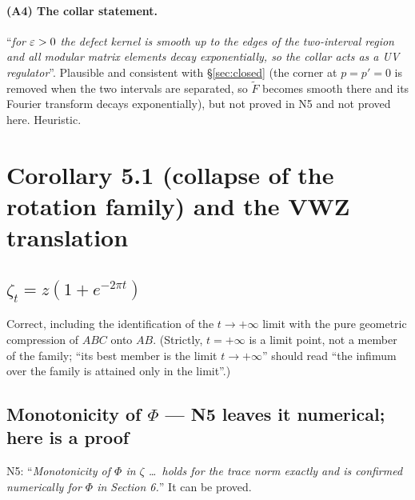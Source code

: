 \documentclass[11pt]{article}
\newcommand{\Nf}[1]{\textsf{[N4,\,#1]}}
\begin{document}
\paragraph{(A4) The collar statement.}
``\emph{for $\varepsilon>0$ the defect kernel is smooth up to the edges of the two-interval region and all
modular matrix elements decay exponentially, so the collar acts as a UV regulator}''.  Plausible
and consistent with \S\ref{sec:closed} (the corner at $p=p'=0$ is removed when the two intervals
are separated, so $\widetilde F$ becomes smooth there and its Fourier transform decays
exponentially), but not proved in N5 and not proved here.  Heuristic.

\section{Corollary 5.1 (collapse of the rotation family) and the VWZ translation}\label{sec:cor51}

\subsection{$\zeta_t=z(1+e^{-2\pi t})$}
\lby{\Nf{eq:s-t}, the convention fixed in N4}
\begin{verdictok}Correct, including the identification of the $t\to+\infty$ limit with the pure
geometric compression of $ABC$ onto $AB$.  (Strictly, $t=+\infty$ is a limit point, not a member
of the family; ``its best member is the limit $t\to+\infty$'' should read ``the infimum over the
family is attained only in the limit''.)\end{verdictok}

\subsection{Monotonicity of $\Phi$ --- N5 leaves it numerical; here is a proof}

N5: ``\emph{Monotonicity of $\Phi$ in $\zeta$ \dots\ holds for the trace norm exactly and is
confirmed numerically for $\Phi$ in Section 6.}''  It can be proved.
\end{document}
